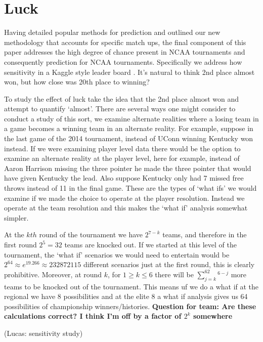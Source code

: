 \section{Luck}

Having detailed popular methods for prediction and outlined our new methodology that accounts for specific match ups, the final component of this paper addresses the high degree of chance present in NCAA tournaments and consequently prediction for NCAA tournaments.  Specifically we address how sensitivity in a Kaggle style leader board . It's natural to think 2nd place almost won, but how close was 20th place to winning? 


To study the effect of luck take the idea that the 2nd place almost won and attempt to quantify `almost'. There are several ways one might consider to conduct a study of this sort, we examine alternate realities where a losing team in a game becomes a winning team in an alternate reality. For example, suppose in the last game of the 2014 tournament, instead of UConn winning Kentucky won instead. If we were examining player level data there would be the option to examine an alternate reality at the player level, here for example, instead of Aaron Harrison missing the three pointer he made the three pointer that would have given Kentucky the lead. Also suppose Kentucky only had 7 missed free throws instead of 11 in the final game. These are the types of `what ifs' we would examine if we made the choice to operate at the player resolution. Instead we operate at the team resolution and this makes the `what if' analysis somewhat simpler. 

At the $kth$ round of the tournament we have $2^{7-k}$ teams, and therefore in the first round $2^5 = 32$ teams are knocked out. If we started at this level of the tournament, the `what if' scenarios we would need to entertain would be $2^64 \approx e^{19.266}\approx 232872115$ different scenarios just at the first round, this is clearly prohibitive. Moreover, at round $k$, for $1\geq k \leq 6$ there will be $\sum_{j=k}^62^{6-j}$ more teams to be knocked out of the tournament. This means uf we do a what if at the regional we have 8 possibilities and at the elite 8 a what if analysis gives us 64 possibilities of championship winners/histories. \textbf{Question for team: Are these calculations correct? I think I'm off by a factor of $2^k$ somewhere}


(Lucas: sensitivity study)
